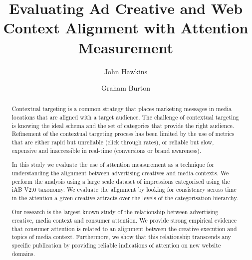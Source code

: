 \documentclass[sigconf]{acmart}
\begin{document}
\title{Evaluating Ad Creative and Web Context Alignment with Attention Measurement}

\author{John Hawkins}
\author{Graham Burton}

\renewcommand{\shortauthors}{Hawkins \& Burton}

\begin{abstract}
Contextual targeting is a common strategy that places marketing messages
in media locations that are aligned with a target audience.
The challenge of contextual targeting is knowing the ideal schema and
the set of categories that provide the right audience.
Refinement of the contextual targeting process has been
limited by the use of metrics that are either rapid but
unreliable (click through rates), or reliable
but slow, expensive and inaccessible in real-time (conversions or brand awareness).

In this study we evaluate the use of attention measurement as a technique for
understanding the alignment between advertising creatives and media contexts.
We perform the analysis using
a large scale dataset of impressions categorised using the iAB V2.0 taxonomy. We
evaluate the alignment by looking for consistency across time in the attention
a given creative attracts over the levels of the categorisation hierarchy.

Our research is the largest known study of the relationship between advertising creative,
media context and consumer attention. We provide strong empirical evidence that consumer
attention is related to an alignment between the creative execution and topics of media
context. Furthermore, we show that this relationship transcends any specific publication
by providing reliable indications of attention on new website domains.

\end{abstract}
\end{document}
